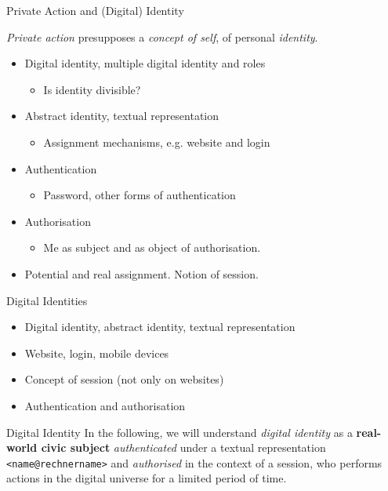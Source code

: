 \documentclass{beamer}
\begin{document}
\begin{frame}{Private Action and (Digital) Identity}

\emph{Private action} presupposes a \emph{concept of self}, of personal
\emph{identity}.
\begin{itemize}
\item Digital identity, multiple digital identity and roles
  \begin{itemize}
  \item[] Is identity divisible?
  \end{itemize}
\item Abstract identity, textual representation
  \begin{itemize}
  \item[] Assignment mechanisms, e.g. website and login
  \end{itemize}
\item Authentication
  \begin{itemize}
  \item[] Password, other forms of authentication
  \end{itemize}
\item Authorisation
  \begin{itemize}
  \item[] Me as subject and as object of authorisation.
  \end{itemize}
\item Potential and real assignment. Notion of session.
\end{itemize}
\end{frame}
\begin{frame}{Digital Identities}
\begin{itemize}
\item Digital identity, abstract identity, textual representation
\item Website, login, mobile devices
\item Concept of session (not only on websites)
\item Authentication and authorisation
\end{itemize}
\begin{block}{Digital Identity}
  In the following, we will understand \emph{digital identity} as a
  \textbf{real-world civic subject} \emph{authenticated} under a textual
  representation \texttt{<name@rechnername>} and \emph{authorised} in the
  context of a session, who performs actions in the digital universe for a
  limited period of time.
\end{block}
\end{frame}
\end{document}
